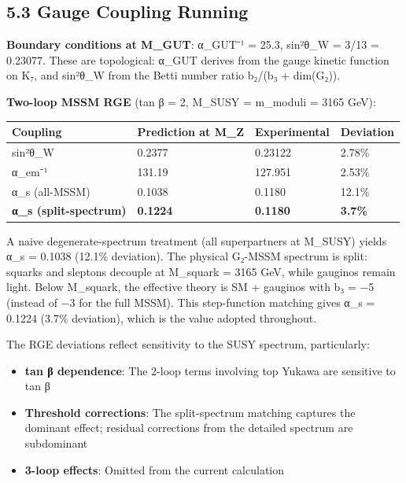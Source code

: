 \documentclass[11pt,a4paper]{article}
\begin{document}
\subsection{5.3 Gauge Coupling Running}\label{gauge-coupling-running}

\textbf{Boundary conditions at M\_\allowbreak{}GUT}: α\_\allowbreak{}GUT⁻¹ = 25.3, sin²θ\_\allowbreak{}W = 3/13 = 0.23077. These are topological: α\_\allowbreak{}GUT derives from the gauge kinetic function on K₇, and sin²θ\_\allowbreak{}W from the Betti number ratio b₂/(b₃ + dim(G₂)).

\textbf{Two-loop MSSM RGE} (tan β = 2, M\_\allowbreak{}SUSY = m\_\allowbreak{}moduli = 3165 GeV):

\begin{longtable}[]{@{}llll@{}}
\toprule\noalign{}
Coupling & Prediction at M\_\allowbreak{}Z & Experimental & Deviation \\
\midrule\noalign{}
\endhead
\bottomrule\noalign{}
\endlastfoot
sin²θ\_\allowbreak{}W & 0.2377 & 0.23122 & 2.78\% \\
α\_\allowbreak{}em⁻¹ & 131.19 & 127.951 & 2.53\% \\
α\_\allowbreak{}s (all-MSSM) & 0.1038 & 0.1180 & 12.1\% \\
\textbf{α\_\allowbreak{}s (split-spectrum)} & \textbf{0.1224} & \textbf{0.1180} & \textbf{3.7\%} \\
\end{longtable}

A naive degenerate-spectrum treatment (all superpartners at M\_\allowbreak{}SUSY) yields α\_\allowbreak{}s = 0.1038 (12.1\% deviation). The physical G₂-MSSM spectrum is split: squarks and sleptons decouple at M\_\allowbreak{}squark = 3165 GeV, while gauginos remain light. Below M\_\allowbreak{}squark, the effective theory is SM + gauginos with b₃ = −5 (instead of −3 for the full MSSM). This step-function matching gives α\_\allowbreak{}s = 0.1224 (3.7\% deviation), which is the value adopted throughout.

The RGE deviations reflect sensitivity to the SUSY spectrum, particularly:

\begin{itemize}
\tightlist
\item
  \textbf{tan β dependence}: The 2-loop terms involving top Yukawa are sensitive to tan β
\item
  \textbf{Threshold corrections}: The split-spectrum matching captures the dominant effect; residual corrections from the detailed spectrum are subdominant
\item
  \textbf{3-loop effects}: Omitted from the current calculation
\end{itemize}
\end{document}

